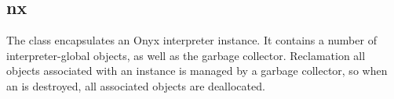 %
%
%
%
%              

\subsection{nx}
\label{nx}

The  class encapsulates an Onyx interpreter instance.  It contains
a number of interpreter-global objects, as well as the garbage collector.
Reclamation all objects associated with an  instance is managed by
a garbage collector, so when an  is destroyed, all associated
objects are deallocated.

